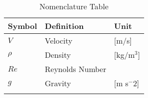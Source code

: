 \section*{}
\begin{longtable}{|p{2.5cm}|p{8cm}|p{2.5cm}|}
    \hline
    Symbol & Definition & Unit \\
    \hline 
    $V$ & Velocity & [m/s] \\
    $\rho$ & Density & [kg/m$^3$] \\
    $ Re$ & Reynolds Number &  \\
    $g$ & Gravity & [m s$^-2$] \\
    \hline
    \caption{Nomenclature Table}
\end{longtable}
